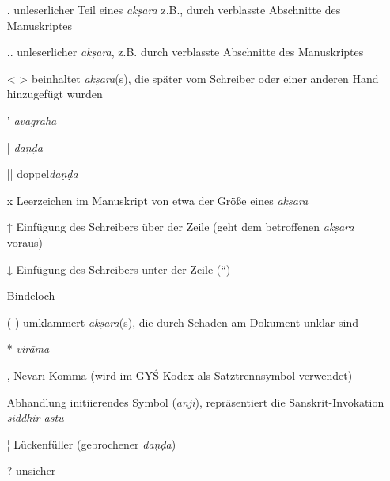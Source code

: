 \documentclass[a4paper,12pt]{article}
\begin{document}
\begin{itemize}
\item[.]    \hspace*{8mm}unleserlicher Teil eines \textit{akṣara} z.B., durch verblasste Abschnitte des Manuskriptes
\item[..]   \hspace*{8mm}unleserlicher \textit{akṣara}, z.B. durch verblasste Abschnitte des Manuskriptes
\item[< >]  \hspace*{8mm}beinhaltet \textit{akṣara}(s), die später vom Schreiber oder einer anderen Hand hinzugefügt wurden 
\item[']    \hspace*{8mm}\textit{avagraha}
\item[|]    \hspace*{8mm}\textit{daṇḍa}
\item[||]   \hspace*{8mm}doppel\textit{daṇḍa} 
\item[x]    \hspace*{8mm}Leerzeichen im Manuskript von etwa der Größe eines \textit{akṣara}
\item[↑]    \hspace*{8mm}Einfügung des Schreibers über der Zeile (geht dem betroffenen \textit{akṣara} voraus)
\item[↓]    \hspace*{8mm}Einfügung des Schreibers unter der Zeile (``)
\item[\textding{◎}] \hspace*{8mm}Bindeloch
\item[( )]  \hspace*{8mm}umklammert \textit{akṣara}(s), die durch Schaden am Dokument unklar sind
\item[*]    \hspace*{8mm}\textit{virāma}
\item[,]    \hspace*{8mm} Nevārī-Komma (wird im GYŚ-Kodex als Satztrennsymbol verwendet)
\item[\textding{≀}] \hspace*{8mm} Abhandlung initiierendes Symbol (\textit{anji}), repräsentiert die Sanskrit-Invokation \textit{siddhir astu}
\item[¦]    \hspace*{8mm}Lückenfüller (gebrochener \textit{daṇḍa}) 
\item[?]    \hspace*{8mm}unsicher
\end{itemize}
\end{document}
